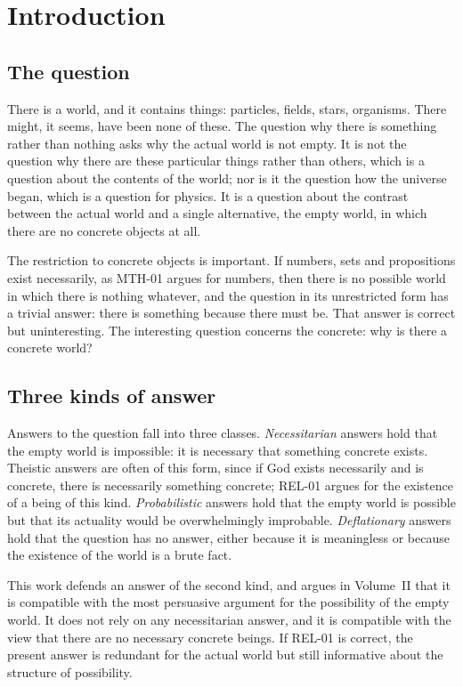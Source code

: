 \documentclass{situationist-preprint}
\begin{document}
\section{Introduction}

\subsection{The question}

There is a world, and it contains things: particles, fields, stars, organisms. There might, it seems, have been none of these. The question why there is something rather than nothing asks why the actual world is not empty. It is not the question why there are these particular things rather than others, which is a question about the contents of the world; nor is it the question how the universe began, which is a question for physics. It is a question about the contrast between the actual world and a single alternative, the empty world, in which there are no concrete objects at all.

The restriction to concrete objects is important. If numbers, sets and propositions exist necessarily, as MTH-01 argues for numbers, then there is no possible world in which there is nothing whatever, and the question in its unrestricted form has a trivial answer: there is something because there must be. That answer is correct but uninteresting. The interesting question concerns the concrete: why is there a concrete world?

\subsection{Three kinds of answer}

Answers to the question fall into three classes. \emph{Necessitarian} answers hold that the empty world is impossible: it is necessary that something concrete exists. Theistic answers are often of this form, since if God exists necessarily and is concrete, there is necessarily something concrete; REL-01 argues for the existence of a being of this kind. \emph{Probabilistic} answers hold that the empty world is possible but that its actuality would be overwhelmingly improbable. \emph{Deflationary} answers hold that the question has no answer, either because it is meaningless or because the existence of the world is a brute fact.

This work defends an answer of the second kind, and argues in Volume~II that it is compatible with the most persuasive argument for the possibility of the empty world. It does not rely on any necessitarian answer, and it is compatible with the view that there are no necessary concrete beings. If REL-01 is correct, the present answer is redundant for the actual world but still informative about the structure of possibility.
\end{document}

